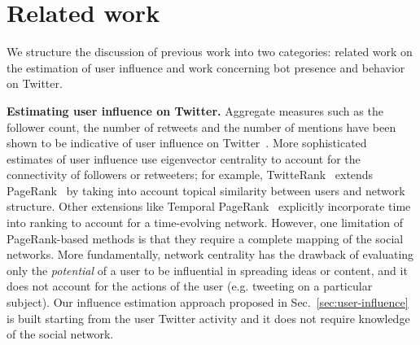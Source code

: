 
\section{Related work}

We structure the discussion of previous work into two categories:
related work on the estimation of user influence and
work concerning bot presence and behavior on Twitter.

\textbf{Estimating user influence on Twitter.}
Aggregate measures such as the follower count, the number of retweets and the number of mentions have been shown to be indicative of user influence on Twitter~\cite{Cha2010,kwak2010twitter}.
More sophisticated estimates of user influence use eigenvector centrality to account for the connectivity of followers or retweeters; 
for example, TwitteRank~\cite{twitterrank} extends PageRank~\cite{pagerank} by taking into account topical similarity between users and network structure.
Other extensions like Temporal PageRank~\cite{rozenshtein2016temporal} explicitly incorporate time into ranking to account for a time-evolving network.
However, one limitation of PageRank-based methods is that they require a complete mapping of the social networks.
More fundamentally, network centrality has the drawback of evaluating only the \textit{potential} of a user to be influential in spreading ideas or content, and it does not account for the actions of the user (e.g. tweeting on a particular subject).
Our influence estimation approach proposed in Sec.~\ref{sec:user-influence} is built starting from the user Twitter activity and it does not require knowledge of the social network.

